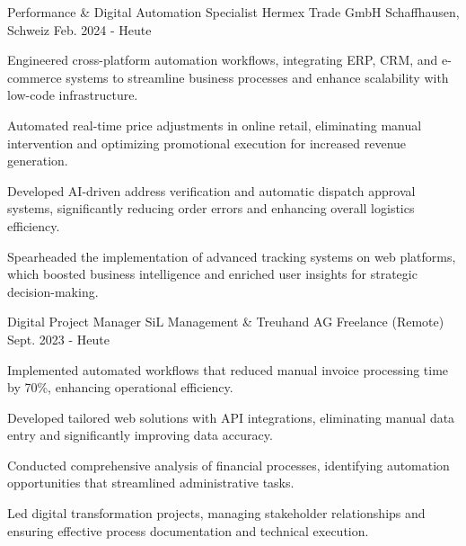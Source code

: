 

\begin{cventries}
\cventry
  {Performance \& Digital Automation Specialist}
  {Hermex Trade GmbH}
  {Schaffhausen, Schweiz}
  {Feb. 2024 - Heute}
  {
    \begin{cvitems}
\item {Engineered cross-platform automation workflows, integrating ERP, CRM, and e-commerce systems to streamline business processes and enhance scalability with low-code infrastructure.}
\item {Automated real-time price adjustments in online retail, eliminating manual intervention and optimizing promotional execution for increased revenue generation.}
\item {Developed AI-driven address verification and automatic dispatch approval systems, significantly reducing order errors and enhancing overall logistics efficiency.}
\item {Spearheaded the implementation of advanced tracking systems on web platforms, which boosted business intelligence and enriched user insights for strategic decision-making.}
\end{cvitems}
  }

\cventry
  {Digital Project Manager}
  {SiL Management \& Treuhand AG}
  {Freelance (Remote)}
  {Sept. 2023 - Heute}
  {
    \begin{cvitems}
\item {Implemented automated workflows that reduced manual invoice processing time by 70\%, enhancing operational efficiency.}
\item {Developed tailored web solutions with API integrations, eliminating manual data entry and significantly improving data accuracy.}
\item {Conducted comprehensive analysis of financial processes, identifying automation opportunities that streamlined administrative tasks.}
\item {Led digital transformation projects, managing stakeholder relationships and ensuring effective process documentation and technical execution.}
\end{cvitems}
  }


\end{cventries}
